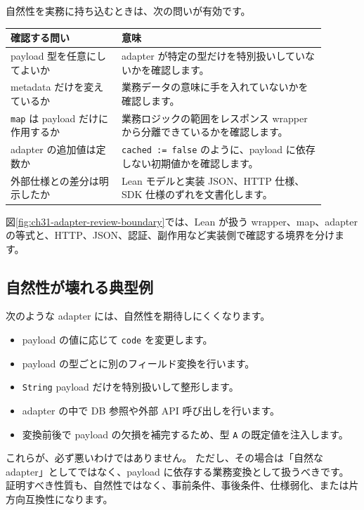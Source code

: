 自然性を実務に持ち込むときは、次の問いが有効です。

\begin{center}
\begin{tabular}{p{0.31\linewidth}p{0.58\linewidth}}
\toprule
確認する問い & 意味 \\
\midrule
payload 型を任意にしてよいか & adapter が特定の型だけを特別扱いしていないかを確認します。 \\
metadata だけを変えているか & 業務データの意味に手を入れていないかを確認します。 \\
\texttt{map} は payload だけに作用するか & 業務ロジックの範囲をレスポンス wrapper から分離できているかを確認します。 \\
adapter の追加値は定数か & \texttt{cached := false} のように、payload に依存しない初期値かを確認します。 \\
外部仕様との差分は明示したか & Lean モデルと実装 JSON、HTTP 仕様、SDK 仕様のずれを文書化します。 \\
\bottomrule
\end{tabular}
\end{center}

図\ref{fig:ch31-adapter-review-boundary}では、Lean が扱う wrapper、map、adapter の等式と、HTTP、JSON、認証、副作用など実装側で確認する境界を分けます。


\subsection{自然性が壊れる典型例}

次のような adapter には、自然性を期待しにくくなります。

\begin{itemize}
\item payload の値に応じて \texttt{code} を変更します。
\item payload の型ごとに別のフィールド変換を行います。
\item \texttt{String} payload だけを特別扱いして整形します。
\item adapter の中で DB 参照や外部 API 呼び出しを行います。
\item 変換前後で payload の欠損を補完するため、型 \texttt{A} の既定値を注入します。
\end{itemize}

これらが、必ず悪いわけではありません。
ただし、その場合は「自然な adapter」としてではなく、payload に依存する業務変換として扱うべきです。
証明すべき性質も、自然性ではなく、事前条件、事後条件、仕様弱化、または片方向互換性になります。

